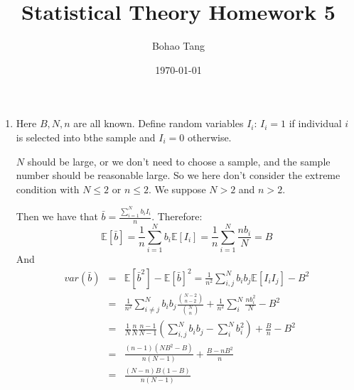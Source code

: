 \documentclass[12pt]{article}
\title{Statistical Theory Homework 5}
\date{\today}
\author{Bohao Tang}
\newcommand{\ep}[1]{\mathbb{E}\left[ #1 \right]}
\newcommand{\var}[1]{var \left( #1 \right)}
\begin{document}

\maketitle

\begin{enumerate}
    \item 
    Here $B, N, n$ are all known. Define random variables $I_i$: $I_i = 1$ if individual $i$ is selected into bthe sample and $I_i = 0$ otherwise.
    
    $N$ should be large, or we don't need to choose a sample, and the sample number should be reasonable large. So we here don't consider the extreme condition with $N \le 2$ or $n \le 2$. We suppose $N > 2$ and $n > 2$. 

    Then we have that $\bar{b} = \frac{\sum_{i=1}^N b_i I_i}{n}$. Therefore:
    $$\ep{\bar{b}} = \frac{1}{n} \sum_{i=1}^N b_i \ep{I_i} = \frac{1}{n} \sum_{i=1}^N \frac{n b_i}{N} = B$$
    And
    \begin{eqnarray}
        \var{\bar{b}} &=& \ep{\bar{b}^2} - \ep{\bar{b}}^2 = \frac{1}{n^2} \sum_{i,j}^{N} b_i b_j \ep{I_i I_j} - B^2 \\
                      &=& \frac{1}{n^2} \sum_{i \ne j}^N b_i b_j \frac{\binom{N-2}{n-2}}{\binom{N}{n}} + \frac{1}{n^2} \sum_{i}^N \frac{n b_i^2}{N} - B^2 \\
                      &=& \frac{1}{N} \frac{n}{N} \frac{n-1}{N-1} (\sum_{i,j}^N b_i b_j - \sum_i^N b_i^2) + \frac{B}{n} - B^2 \\
                      &=& \frac{(n-1) (N B^2 - B)}{n (N-1)} + \frac{B - n B^2}{n} \\
                      &=& \frac{(N-n)B(1-B)}{n(N-1)}
    \end{eqnarray} 


\end{enumerate}
\end{document}
